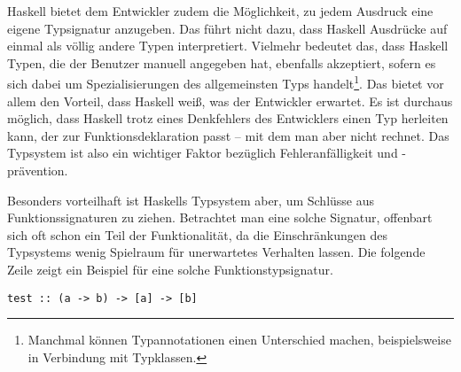 Haskell bietet dem Entwickler zudem die Möglichkeit, zu jedem Ausdruck eine eigene Typsignatur anzugeben. Das führt nicht dazu,
dass Haskell Ausdrücke auf einmal als völlig andere Typen interpretiert. Vielmehr bedeutet das, dass Haskell Typen, die der
Benutzer manuell angegeben hat, ebenfalls akzeptiert, sofern es sich dabei um Spezialisierungen des allgemeinsten Typs handelt\footnote{Manchmal können Typannotationen einen Unterschied machen, beispielsweise in Verbindung mit Typklassen.}.
Das bietet vor allem den Vorteil, dass Haskell weiß, was der Entwickler erwartet. Es ist durchaus möglich, dass Haskell trotz eines
Denkfehlers des Entwicklers einen Typ herleiten kann, der zur Funk\-tions\-de\-kla\-rati\-on passt -- mit dem man aber nicht rechnet.
 Das Typsystem ist also ein wichtiger Faktor bezüglich Fehleranfälligkeit und -prävention.

Besonders vorteilhaft ist Haskells Typsystem aber, um Schlüsse aus Funk\-tions\-sig\-na\-tu\-ren zu ziehen. Betrachtet man eine solche Signatur, offenbart sich oft schon ein Teil der Funktionalität, da die
Einschränkungen des Typsystems wenig Spielraum für unerwartetes Verhalten lassen. Die folgende Zeile zeigt ein Beispiel
für eine solche Funktionstypsignatur.
%

\begin{verbatim}
test :: (a -> b) -> [a] -> [b]
\end{verbatim}

